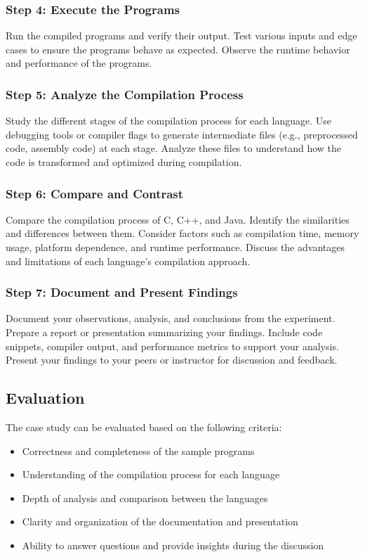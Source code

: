 \documentclass[12pt]{article}
\begin{document}
\subsubsection*{Step 4: Execute the Programs}
Run the compiled programs and verify their output. Test various inputs and edge cases to ensure the programs behave as expected. Observe the runtime behavior and performance of the programs.

\subsubsection*{Step 5: Analyze the Compilation Process}
Study the different stages of the compilation process for each language. Use debugging tools or compiler flags to generate intermediate files (e.g., preprocessed code, assembly code) at each stage. Analyze these files to understand how the code is transformed and optimized during compilation.

\subsubsection*{Step 6: Compare and Contrast}
Compare the compilation process of C, C++, and Java. Identify the similarities and differences between them. Consider factors such as compilation time, memory usage, platform dependence, and runtime performance. Discuss the advantages and limitations of each language's compilation approach.

\subsubsection*{Step 7: Document and Present Findings}
Document your observations, analysis, and conclusions from the experiment. Prepare a report or presentation summarizing your findings. Include code snippets, compiler output, and performance metrics to support your analysis. Present your findings to your peers or instructor for discussion and feedback.

\subsection*{Evaluation}
The case study can be evaluated based on the following criteria:
\begin{itemize}
    \item Correctness and completeness of the sample programs
    \item Understanding of the compilation process for each language
    \item Depth of analysis and comparison between the languages
    \item Clarity and organization of the documentation and presentation
    \item Ability to answer questions and provide insights during the discussion
\end{itemize}
\end{document}
